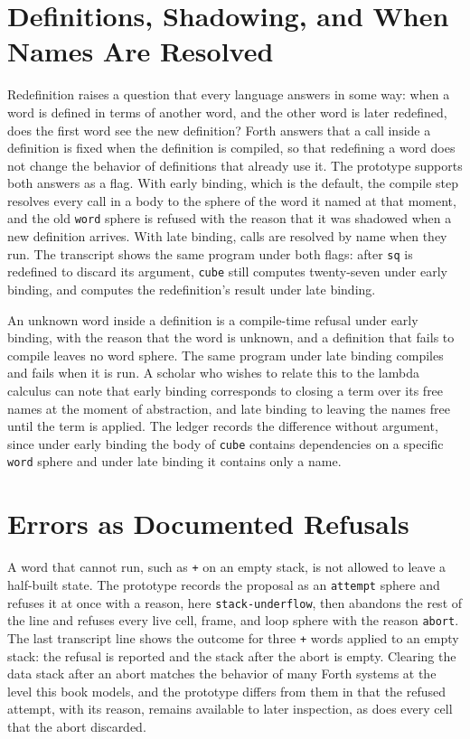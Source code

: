 \documentclass[11pt,oneside]{report}
\theoremstyle{plain}
\theoremstyle{definition}
\theoremstyle{remark}
\newcommand{\code}[2][Python]{}
\begin{document}
\code{ex_forth_call}

\section{Definitions, Shadowing, and When Names Are Resolved}

Redefinition raises a question that every language answers in some way: when a word is defined in terms of another word, and the other word is later redefined, does the first word see the new definition? Forth answers that a call inside a definition is fixed when the definition is compiled, so that redefining a word does not change the behavior of definitions that already use it. The prototype supports both answers as a flag. With early binding, which is the default, the compile step resolves every call in a body to the sphere of the word it named at that moment, and the old \texttt{word} sphere is refused with the reason that it was shadowed when a new definition arrives. With late binding, calls are resolved by name when they run. The transcript shows the same program under both flags: after \texttt{sq} is redefined to discard its argument, \texttt{cube} still computes twenty-seven under early binding, and computes the redefinition's result under late binding.

An unknown word inside a definition is a compile-time refusal under early binding, with the reason that the word is unknown, and a definition that fails to compile leaves no word sphere. The same program under late binding compiles and fails when it is run. A scholar who wishes to relate this to the lambda calculus can note that early binding corresponds to closing a term over its free names at the moment of abstraction, and late binding to leaving the names free until the term is applied. The ledger records the difference without argument, since under early binding the body of \texttt{cube} contains dependencies on a specific \texttt{word} sphere and under late binding it contains only a name.

\section{Errors as Documented Refusals}

A word that cannot run, such as \texttt{+} on an empty stack, is not allowed to leave a half-built state. The prototype records the proposal as an \texttt{attempt} sphere and refuses it at once with a reason, here \texttt{stack-underflow}, then abandons the rest of the line and refuses every live cell, frame, and loop sphere with the reason \texttt{abort}. The last transcript line shows the outcome for three \texttt{+} words applied to an empty stack: the refusal is reported and the stack after the abort is empty. Clearing the data stack after an abort matches the behavior of many Forth systems at the level this book models, and the prototype differs from them in that the refused attempt, with its reason, remains available to later inspection, as does every cell that the abort discarded.
\end{document}
